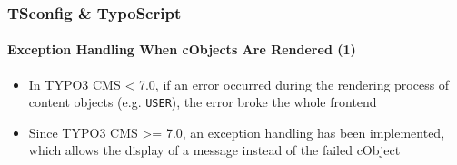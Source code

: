 
\begin{frame}[fragile]
	\frametitle{TSconfig \& TypoScript}
	\framesubtitle{Exception Handling When cObjects Are Rendered (1)}

	\begin{itemize}
		\item In TYPO3 CMS < 7.0, if an error occurred during the rendering process of content objects (e.g. \texttt{USER}), the error broke the whole frontend
		\item Since TYPO3 CMS >= 7.0, an exception handling has been implemented, which allows the display of a message instead of the failed cObject
	\end{itemize}

%

\end{frame}


